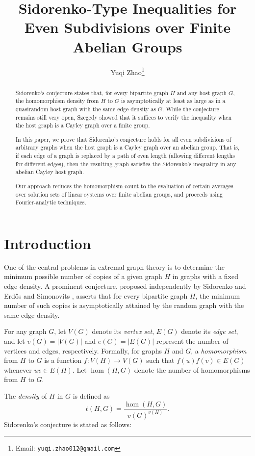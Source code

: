 \documentclass[12pt,a4paper]{article}
\title{Sidorenko-Type Inequalities for Even Subdivisions over Finite Abelian Groups}
\author{Yuqi Zhao\thanks{Email: \texttt{yuqi.zhao012@gmail.com}}}
\date{}
\theoremstyle{definition}
\theoremstyle{plain}
\theoremstyle{definition}
\begin{document}
\maketitle

\begin{abstract}
Sidorenko’s conjecture states that, for every bipartite graph $H$ and any host graph $G$, the homomorphism density from $H$ to $G$ is asymptotically at least as large as in a quasirandom host graph with the same edge density as $G$. While the conjecture remains still very open, Szegedy showed that it suffices to verify the inequality when the host graph is a Cayley graph over a finite group.

In this paper, we prove that Sidorenko's conjecture holds for all even subdivisions of arbitrary graphs when the host graph is a Cayley graph over an abelian group. That is, if each edge of a graph is replaced by a path of even length (allowing different lengths for different edges), then the resulting graph satisfies the Sidorenko's inequality in any abelian Cayley host graph.

Our approach reduces the homomorphism count to the evaluation of certain averages over solution sets of linear systems over finite abelian groups, and proceeds using Fourier-analytic techniques. 
\end{abstract}
\section{Introduction}
One of the central problems in extremal graph theory is to determine the minimum possible number of copies of a given graph $H$ in graphs with a fixed edge density. A prominent conjecture, proposed independently by Sidorenko \cite{sidorenko1993correlation, sidorenko1991inequalities} and Erd\H{o}s and Simonovits \cite{erdos1984cube}, asserts that for every bipartite graph $H$, the minimum number of such copies is asymptotically attained by the random graph with the same edge density. 

For any graph $G$, let $V(G)$ denote its \emph{vertex set}, $E(G)$ denote its \emph{edge set}, and let $v(G) = |V(G)|$ and $e(G) = |E(G)|$ represent the number of vertices and edges, respectively. Formally, for graphs $H$ and $G$, a \emph{homomorphism} from $H$ to $G$ is a function $f: V(H) \to V(G)$ such that $f(u)f(v) \in E(G)$ whenever $uv \in E(H)$. Let $\hom(H, G)$ denote the number of homomorphisms from $H$ to $G$. 

The \emph{density} of $H$ in $G$ is defined as
\[
t(H, G) = \frac{\hom(H, G)}{v(G)^{v(H)}}.
\]
Sidorenko's conjecture is stated as follows:
\end{document}
